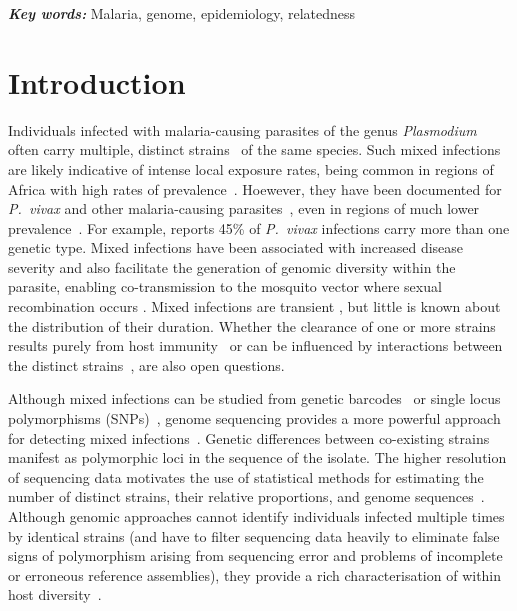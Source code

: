 \documentclass[9pt,lineno]{elife}
\providecommand{\keywords}[1]{\textbf{\textit{Key words:}} #1}
\begin{document}
\keywords{Malaria, genome, epidemiology, relatedness}


\section{Introduction}


Individuals infected with malaria-causing parasites of the genus {\it Plasmodium} often carry multiple, distinct strains~\citep{Bell2006} of the same species.  Such mixed infections are likely indicative of intense local exposure rates, being common in regions of Africa with high rates of prevalence~\citep{Bhatt2015, Howes2016}. Hoewever, they have been documented for {\it P.~vivax} and other malaria-causing parasites~\citep{Mueller2007, Collins2012}, even in regions of much lower prevalence~\citep{Howes2016, Steenkeste2010}.  For example, \citet{Pearson2016} reports 45\% of {\it P.~vivax} infections carry more than one genetic type.  Mixed infections have been associated with increased disease severity \citep{deRoode2005} and also facilitate the generation of genomic diversity within the parasite, enabling co-transmission to the mosquito vector where sexual recombination occurs \citep{Mzilahowa2007}.  Mixed infections are transient \citep{Bruce2002, Zimmerman2004}, but little is known about the distribution of their duration. Whether the clearance of one or more strains results purely from host immunity~\citep{Borrmann2011} or can be influenced by interactions between the distinct strains~\citep{Enosse2006, Bushman2016}, are also open questions.

Although mixed infections can be studied from genetic barcodes~\citep{Galinsky2015} or single locus polymorphisms (SNPs)~\citep{Jack2016}, genome sequencing provides a more powerful approach for detecting mixed infections~\citep{Chang2017}.  Genetic differences between co-existing strains manifest as polymorphic loci in the sequence of the isolate. The higher resolution of sequencing data motivates the use of statistical methods for estimating the number of distinct strains, their relative proportions, and genome sequences~\citep{Zhu2017}.  Although genomic approaches cannot identify individuals infected multiple times by identical strains (and have to filter sequencing data heavily to eliminate false signs of polymorphism arising from sequencing error and problems of incomplete or erroneous reference assemblies), they provide a rich characterisation of within host diversity~\citep{Manske2012}.
\end{document}

